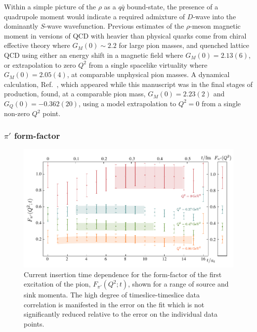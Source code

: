 \documentclass[twocolumn,amsmath,amssymb,prd,10pt,floatfix, 
superscriptaddress,nofootinbib, showpacs, preprintnumbers]{revtex4-1}
\begin{document}
Within a simple picture of the $\rho$ as a $q\bar{q}$ bound-state, the presence of a quadrupole moment would indicate a required admixture of $D$-wave into the dominantly $S$-wave wavefunction. Previous estimates of the $\rho$-meson magnetic moment in versions of QCD with heavier than physical quarks come from chiral effective theory \cite{Djukanovic:2013mka} where $G_M(0) \sim 2.2$ for large pion masses, and quenched lattice QCD using either an energy shift in a magnetic field \cite{Lee:2008qf} where $G_M(0) = 2.13(6)$, or extrapolation to zero $Q^2$ from a single spacelike virtuality \cite{Hedditch:2007ex} where $G_M(0) = 2.05(4)$, at comparable unphysical pion masses. A dynamical calculation, Ref.~\cite{Owen:2015gva}, which appeared while this manuscript was in the final stages of production, found, at a comparable pion mass, $G_M(0) = 2.23(2)$ and $G_Q(0) = -0.362(20)$, using a model extrapolation to $Q^2=0$ from a single non-zero $Q^2$ point.



\subsubsection{$\pi'$ form-factor}




\begin{figure}[b]
  \includegraphics[width=\linewidth]{fig15.pdf}
  \caption{Current insertion time dependence for the form-factor of the first excitation of the pion, $F_{\pi'}(Q^2;t)$, shown for a range of source and sink momenta. The high degree of timeslice-timeslice data correlation  is manifested in the error on the fit which is not significantly reduced relative to the error on the individual data points. \label{fig::pion_proj1_pion_proj1_Q2_dep}}
\end{figure}
\end{document}
